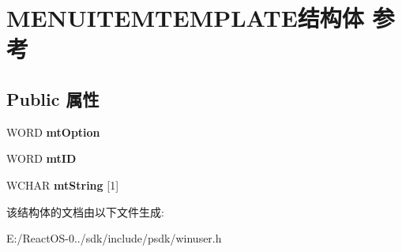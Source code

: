 \hypertarget{struct_m_e_n_u_i_t_e_m_t_e_m_p_l_a_t_e}{}\section{M\+E\+N\+U\+I\+T\+E\+M\+T\+E\+M\+P\+L\+A\+T\+E结构体 参考}
\label{struct_m_e_n_u_i_t_e_m_t_e_m_p_l_a_t_e}
\subsection*{Public 属性}
\begin{DoxyCompactItemize}
\item 
\mbox{\label{struct_m_e_n_u_i_t_e_m_t_e_m_p_l_a_t_e_a0d3197e8bfb868442cc71944fb495d2c}} 
W\+O\+RD {\bfseries mt\+Option}
\item 
\mbox{\label{struct_m_e_n_u_i_t_e_m_t_e_m_p_l_a_t_e_a8b1ef4b5e3dab97397b59b9cb82e6378}} 
W\+O\+RD {\bfseries mt\+ID}
\item 
\mbox{\label{struct_m_e_n_u_i_t_e_m_t_e_m_p_l_a_t_e_a5e434f7a515ff3d04b79bff7258112f5}} 
W\+C\+H\+AR {\bfseries mt\+String} \mbox{[}1\mbox{]}
\end{DoxyCompactItemize}


该结构体的文档由以下文件生成\+:\begin{DoxyCompactItemize}
\item 
E\+:/\+React\+O\+S-\/0../sdk/include/psdk/winuser.\+h\end{DoxyCompactItemize}
